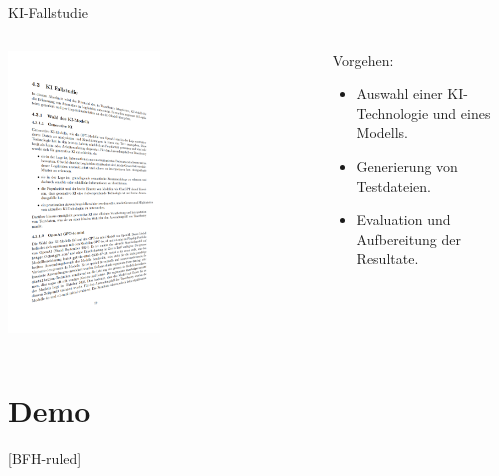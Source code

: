 \documentclass[
    ngerman,%
    authorontitle=true,
]{bfhbeamer}
\begin{document}
    \begin{frame}{KI-Fallstudie}
        \begin{columns}
            \begin{column}{0.5\textwidth}
                \begin {center}
                    \includegraphics[width=0.5\textwidth]{assets/presentation/ki-fallstudie-tilted}
                \end{center}
            \end{column}
            \begin{column}{0.5\textwidth}
                Vorgehen:
                \begin{itemize}
                    \item Auswahl einer KI-Technologie und eines Modells.
                    \item Generierung von Testdateien.
                    \item Evaluation und Aufbereitung der Resultate.
                \end{itemize}
            \end{column}
        \end{columns}
    \end{frame}


    \section{Demo}\label{sec:demo}
    [BFH-ruled]
    \frame{\sectionpage}
\end{document}
